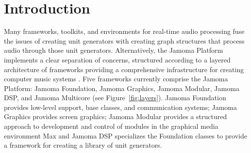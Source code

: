 \documentclass[twoside,a4paper]{article}
\title{\papertitle}
\begin{document}

\maketitle






\begin{abstract}

Jamoma Multicore is a framework for creating graph structures in which unit generators are connected together to process multichannel audio in real-time.  The main applications currently are processing of multichannel audio signals in Max/MSP and live audio coding in Ruby.  Jamoma Multicore forms part of the Jamoma layered architecture.


\end{abstract}




\section{Introduction} %
\label{sec:intro}

Many frameworks, toolkits, and environments for real-time audio processing fuse the issues of creating unit generators with creating graph structures that process audio through those unit generators.  Alternatively, the Jamoma Platform implements a clear separation of concerns, structured according to a layered architecture of frameworks providing a comprehensive infrastructure for creating computer music systems \cite{Place:2010}. Five frameworks currently comprise the Jamoma Platform: Jamoma Foundation, Jamoma Graphics, Jamoma Modular, Jamoma DSP, and Jamoma Multicore (see Figure~\ref{fig:layers}). Jamoma Foundation provides low-level support, base classes, and communication systems; Jamoma Graphics provides screen graphics; Jamoma Modular provides a structured approach to development and control of modules in the graphical media environment Max \cite{Place:2006} and Jamoma DSP specializes the Foundation classes to provide a framework for creating a library of unit generators. 
\end{document}
